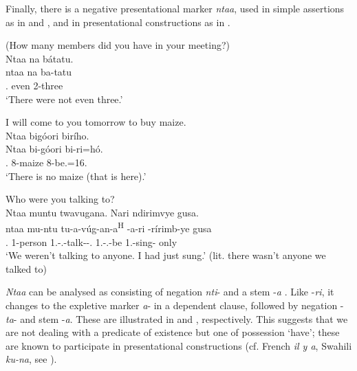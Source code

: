 \documentclass[output=paper]{langscibook}
\begin{document}
  Finally, there is a negative presentational marker \textit{ntaa}, used in simple assertions as in  and , and in presentational constructions as in . 

\ea
\label{bkm:Ref75419400}
(How many members did you have in your meeting?)\\
Ntaa na bátatu.\\
\gll
ntaa  na  ba-tatu\\
\NEG.\COP{}  even  2-three\\
\glt
‘There were not even three.’\\

\z

\ea
\label{bkm:Ref75419402}
\begin{xlist}
 I will come to you tomorrow to buy maize.\\
Ntaa bigóori birího.\\
\gll
Ntaa  bi-góori  bi-ri=hó.\\
\NEG{}.\COP{}  8-maize  8-be.\REL{}=16.\PRO{}\\
\glt
‘There is no maize (that is here).’\\

\end{xlist}
\z

\ea
\label{bkm:Ref75354090}
\begin{xlist}
  Who were you talking to?\\
Ntaa muntu twavugana. Nari ndirimvye gusa. \\  %
\gll
ntaa  mu-ntu  tu-a-vúg-an-a\textsuperscript{H}  \N{}-a-ri   \N{}-rírimb-ye  gusa \\
\NEG.\COP{}  1-person  1\PL.\SM-\N.\PST-{}talk-\ASS-\FV.\REL{}  1\SG.\SM-\N.\PST{}-be   1\SG.\SM{}-sing-\PFV{}  only\\
\glt
  ‘We weren't talking to anyone. I had just sung.’ (lit. there wasn’t anyone we talked to)\\

\end{xlist}
\z

\textit{Ntaa} can be analysed as consisting of negation \textit{nti}- and a stem -\textit{a} \citep{LafkiouiEtAl2016}. Like -\textit{ri}, it changes to the expletive marker \textit{a}- in a dependent clause, followed by negation -\textit{ta}- and stem -\textit{a}. These are illustrated in  and , respectively. This suggests that we are not dealing with a predicate of existence but one of possession ‘have’; these are known to participate in presentational constructions (cf. French \textit{il y a}, Swahili \textit{ku-na}, see \citealt{Marten2013}).
\end{document}

